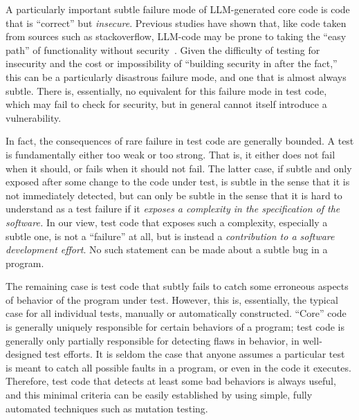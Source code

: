\documentclass[sigconf,natbib=false]{acmart}
\begin{document}
A particularly important subtle failure mode of LLM-generated core code is
code that is ``correct'' but \emph{insecure}.  Previous studies have
shown that, like code taken from sources such as stackoverflow,
LLM-code may be prone to taking the ``easy path'' of functionality
without security~\cite{pearce2022asleep,sandoval2023lost,siddiq2023generate}.  Given the
difficulty of testing for insecurity and the cost or impossibility of
``building security in after the fact,'' this can be a particularly
disastrous failure mode, and one that is almost always subtle.  There
is, essentially, no equivalent for this failure mode in test code,
which may fail to check for security, but in general cannot itself
introduce a vulnerability.

In fact, the consequences of rare failure in test code are generally
bounded.  A test is fundamentally either too weak or too strong.  That
is, it either does not fail when it should, or fails when it should
not fail.  The latter case, if subtle and only exposed after some
change to the code under test, is subtle in the sense that it is not
immediately detected, but can only be subtle in the sense that it is
hard to understand as a test failure if it \emph{exposes a complexity
  in the specification of the software.}  In our view, test code that
exposes such a complexity, especially a subtle one, is not a
``failure'' at all, but is instead a \emph{contribution to a software
  development effort}.  No such statement can be made about a subtle
bug in a program.

The remaining case is test code that subtly fails to catch some
erroneous aspects of behavior of the program under test.  However,
this is, essentially, the typical case for all individual tests,
manually or automatically constructed.  ``Core'' code is generally
uniquely responsible for certain behaviors of a program; test code is
generally only partially responsible for detecting flaws in behavior,
in well-designed test efforts.  It is seldom the case that anyone
assumes a particular test is meant to catch all possible faults in a
program, or even in the code it executes.  Therefore, test code that detects at
least some bad behaviors is always useful, and this minimal criteria
can be easily established by using simple, fully automated techniques
such as mutation testing.




\end{document}
